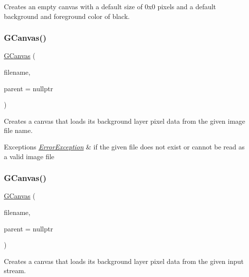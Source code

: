 Creates an empty canvas with a default size of 0x0 pixels and a default background and foreground color of black. 

\mbox{\label{classGCanvas_a0a9de139286d0fc9146928aff8f0538c}} 
\subsubsection{\texorpdfstring{G\+Canvas()}{GCanvas()}\hspace{0.1cm}{\footnotesize\ttfamily [2/5]}}
{\footnotesize\ttfamily \mbox{\hyperlink{classGCanvas}{G\+Canvas}} (\begin{DoxyParamCaption}\item[{const std\+::string \&}]{filename,  }\item[{Q\+Widget $\ast$}]{parent = {\ttfamily nullptr} }\end{DoxyParamCaption})}



Creates a canvas that loads its background layer pixel data from the given image file name. 


\begin{DoxyExceptions}{Exceptions}
{\em \mbox{\hyperlink{classErrorException}{Error\+Exception}}} & if the given file does not exist or cannot be read as a valid image file \\
\hline
\end{DoxyExceptions}
\mbox{\label{classGCanvas_a18f1866349219dd73545c6b548ff3b0e}} 
\subsubsection{\texorpdfstring{G\+Canvas()}{GCanvas()}\hspace{0.1cm}{\footnotesize\ttfamily [3/5]}}
{\footnotesize\ttfamily \mbox{\hyperlink{classGCanvas}{G\+Canvas}} (\begin{DoxyParamCaption}\item[{std\+::istream \&}]{filename,  }\item[{Q\+Widget $\ast$}]{parent = {\ttfamily nullptr} }\end{DoxyParamCaption})}



Creates a canvas that loads its background layer pixel data from the given input stream. 


